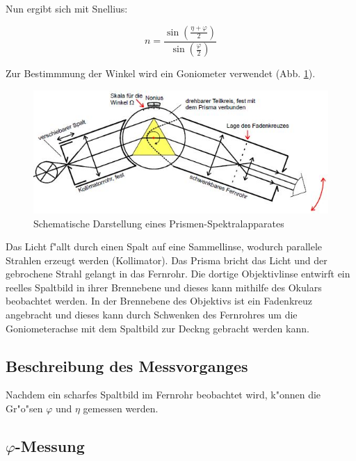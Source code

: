 	Nun ergibt sich mit Snellius:

	\begin{equation}
		n = \frac{\sin(\frac{\eta+\varphi}{2})}{\sin(\frac{\varphi}{2})} \label{eqn:brechungsindex}
	\end{equation}

	Zur Bestimmmung der Winkel wird ein Goniometer verwendet (Abb. \ref{gonio}).

	\begin{figure}[!h]
		\centering
		\includegraphics[width = 12cm]{img/gonio.JPG}
		\caption{Schematische Darstellung eines Prismen-Spektralapparates \cite{anleitung}}
		\label{gonio}
	\end{figure}

	Das Licht f"allt durch einen Spalt auf eine Sammellinse, wodurch parallele Strahlen erzeugt werden (Kollimator).
	Das Prisma bricht das Licht und der gebrochene Strahl gelangt in das Fernrohr. Die dortige Objektivlinse entwirft ein reelles Spaltbild in ihrer Brennebene und dieses kann mithilfe des Okulars beobachtet werden.
	In der Brennebene des Objektivs ist ein Fadenkreuz angebracht und dieses kann durch Schwenken des Fernrohres um die Goniometerachse mit dem Spaltbild zur Deckng gebracht werden kann.

	\subsection{Beschreibung des Messvorganges} %
	\label{sub:beschreibung_des_messvorganges}
	
	Nachdem ein scharfes Spaltbild im Fernrohr beobachtet wird, k"onnen die Gr"o"sen $\varphi$ und $\eta$ gemessen werden.

	\subsection{$\varphi$-Messung} %
	\label{sub:varphi_}
	
